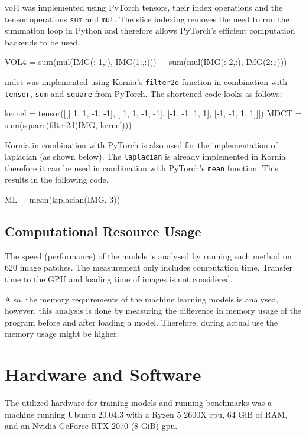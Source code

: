 \Ac{vol4} was implemented using PyTorch tensors, their index operations and the tensor operations \texttt{sum} and \texttt{mul}. The slice indexing removes the need to run the summation loop in Python and therefore allows PyTorch's efficient computation backends to be used.

\begin{python}
VOL4 = sum(mul(IMG(:-1,:), IMG(1:,:)))      \
        - sum(mul(IMG(:-2,:), IMG(2:,:)))
\end{python}


\Ac{mdct} was implemented using Kornia's \texttt{filter2d} function in combination with \texttt{tensor}, \texttt{sum} and \texttt{square} from PyTorch. The shortened code looks as follows:

\begin{python}
kernel = tensor([[[ 1,  1, -1, -1],
                  [ 1,  1, -1, -1],
                  [-1, -1,  1,  1],
                  [-1, -1,  1,  1]]])
MDCT = sum(square(filter2d(IMG, kernel)))
\end{python}

Kornia in combination with PyTorch is also used for the implementation of \ac{laplacian} (as shown below). The \texttt{laplacian} is already implemented in Kornia therefore it can be used in combination with PyTorch's \texttt{mean} function. This results in the following code.

\begin{python}
ML = mean(laplacian(IMG, 3))
\end{python}

\subsection{Computational Resource Usage}
\label{sec:Methods:Evaluation:Computation}

The speed (performance) of the models is analysed by running each method on 620 image patches. The measurement only includes computation time. Transfer time to the GPU and loading time of images is not considered.

Also, the memory requirements of the machine learning models is analysed, however, this analysis is done by measuring the difference in memory usage of the program before and after loading a model. Therefore, during actual use the memory usage might be higher.

\section{Hardware and Software}
\label{sec:Methods:Hardware}

The utilized hardware for training models and running benchmarks was a machine running Ubuntu 20.04.3 with a Ryzen 5 2600X \ac{cpu}, 64 GiB of RAM, and an Nvidia GeForce RTX 2070 (8 GiB) \ac{gpu}.

